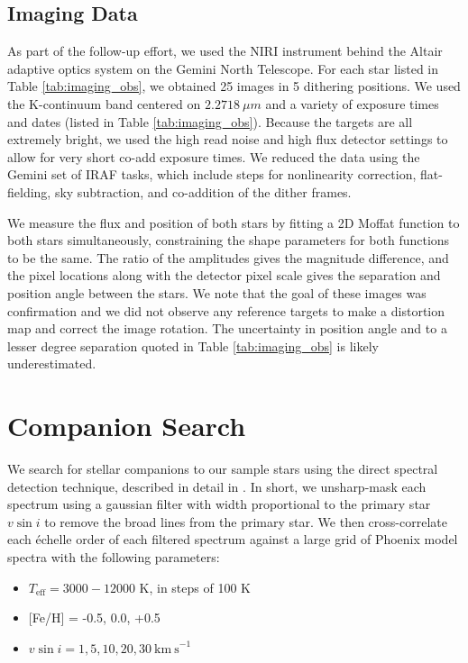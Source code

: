 \documentclass{emulateapj}
\begin{document}
\subsection{Imaging Data}
As part of the follow-up effort, we used the NIRI instrument behind the Altair adaptive optics system on the Gemini North Telescope. For each star listed in Table \ref{tab:imaging_obs}, we obtained 25 images in 5 dithering positions. We used the K-continuum band centered on $2.2718\ \mu m$ and a variety of exposure times and dates (listed in Table \ref{tab:imaging_obs}). Because the targets are all extremely bright, we used the high read noise and high flux detector settings to allow for very short co-add exposure times. We reduced the data using the Gemini set of IRAF tasks, which include steps for nonlinearity correction, flat-fielding, sky subtraction, and co-addition of the dither frames. 

We measure the flux and position of both stars by fitting a 2D Moffat function \citep{Moffat1969} to both stars simultaneously, constraining the shape parameters for both functions to be the same. The ratio of the amplitudes gives the magnitude difference, and the pixel locations along with the detector pixel scale gives the separation and position angle between the stars. We note that the goal of these images was confirmation and we did not observe any reference targets to make a distortion map and correct the image rotation. The uncertainty in position angle and to a lesser degree separation quoted in Table \ref{tab:imaging_obs} is likely underestimated.





\section{Companion Search}
\label{sec:companions}

We search for stellar companions to our sample stars using the direct spectral detection technique, described in detail in \citet{Gullikson2016}. In short, we unsharp-mask each spectrum using a gaussian filter with width proportional to the primary star $v\sin{i}$ to remove the broad lines from the primary star. We then cross-correlate each \'echelle order of each filtered spectrum against a large grid of Phoenix model spectra \citep{Husser2013_b} with the following parameters:

\begin{itemize}
\item $T_\mathrm{eff} = 3000-12000$ K, in steps of 100 K
\item {[}Fe/H{]} = -0.5, 0.0, +0.5
\item $v\sin{i} = 1, 5, 10, 20, 30 \ \mathrm{km\ s}^{-1}$
\end{itemize}
\end{document}
